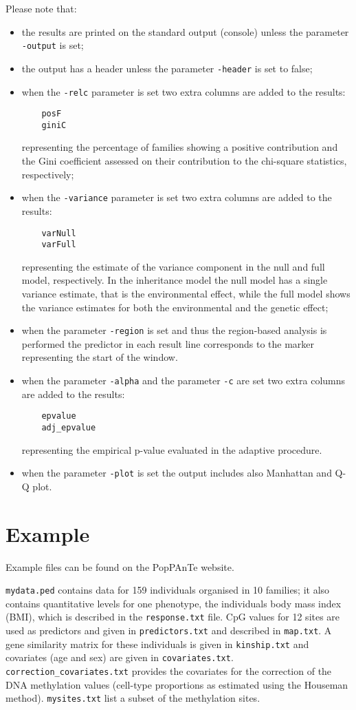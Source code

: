 \documentclass[a4paper,9pt]{article}
\newcommand{\minusitem}{\item[-]}
\begin{document}
\noindent
Please note that:
\begin{itemize}
	\setlength{\itemsep}{-3pt}
		\minusitem the results are printed on the standard output (console) unless the parameter \texttt{-output} is set;
		\minusitem the output has a header unless the parameter \texttt{-header} is set to false;
		\minusitem when the \texttt{-relc} parameter is set two extra columns are added to the results:
\begin{Verbatim}
	posF
	giniC
\end{Verbatim}
		representing the percentage of families showing a positive contribution and the Gini coefficient assessed on their contribution to the chi-square statistics, respectively;
		\minusitem when the \texttt{-variance} parameter is set two extra columns are added to the results:
\begin{Verbatim}
	varNull
	varFull
\end{Verbatim}
		representing the estimate of the variance component in the null and full model, respectively. In the inheritance model the null model has a single variance estimate, that is the environmental effect, while the full model shows the variance estimates for both the environmental and the genetic effect;		
		\minusitem when the parameter \texttt{-region} is set and thus the region-based analysis is performed the predictor in each result line corresponds to the marker representing the start of the window.
		\minusitem when the parameter \texttt{-alpha} and the parameter \texttt{-c} are set two extra columns are added to the results:
\begin{Verbatim}
	epvalue
	adj_epvalue
\end{Verbatim}
		representing the empirical p-value evaluated in the adaptive procedure.
	\minusitem when the parameter \texttt{-plot} is set the output includes also Manhattan and Q-Q plot. 
\end{itemize}


\section{Example}
Example files can be found on the PopPAnTe website.

\vspace{0.3cm}

\noindent
\texttt{mydata.ped} contains data for 159 individuals organised in 10 families; it also contains quantitative levels for one phenotype, the individuals body mass index (BMI), which is described in the \texttt{response.txt} file. CpG values for 12 sites are used as predictors and given in \texttt{predictors.txt} and described in \texttt{map.txt}. 
A gene similarity matrix for these individuals is given in \texttt{kinship.txt} and covariates (age and sex) are given in \texttt{covariates.txt}. \texttt{correction\_covariates.txt} provides the covariates for the correction of the DNA methylation values (cell-type proportions as estimated using the Houseman method). \texttt{mysites.txt} list a subset of the methylation sites.
\end{document}
